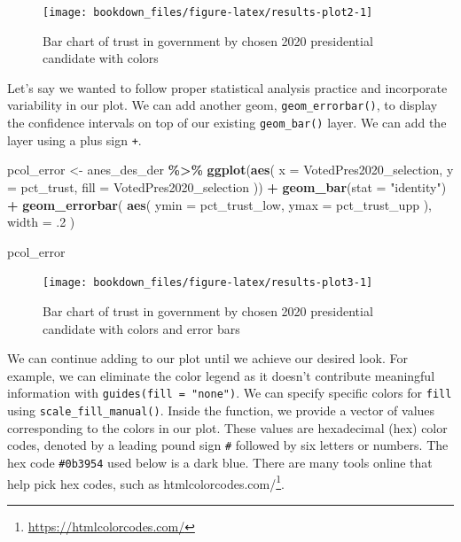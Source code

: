 \documentclass[
]{krantz}
\makeatletter
\newenvironment{Shaded}{\begin{snugshade}}{\end{snugshade}}
\newcommand{\AttributeTok}[1]{\textcolor[rgb]{0.27,0.27,0.27}{#1}}
\newcommand{\DecValTok}[1]{\textcolor[rgb]{0.06,0.06,0.06}{#1}}
\newcommand{\FunctionTok}[1]{\textcolor[rgb]{0.27,0.27,0.27}{\textbf{#1}}}
\newcommand{\NormalTok}[1]{#1}
\newcommand{\OtherTok}[1]{\textcolor[rgb]{0.37,0.37,0.37}{#1}}
\newcommand{\SpecialCharTok}[1]{\textcolor[rgb]{0.43,0.43,0.43}{\textbf{#1}}}
\newcommand{\StringTok}[1]{\textcolor[rgb]{0.5,0.5,0.5}{#1}}
\renewcommand{\href}[2]{#2\footnote{\url{#1}}}
\newenvironment{kframe}{%
\medskip{}
\setlength{\fboxsep}{.8em}
 \def\at@end@of@kframe{}%
 \ifinner\ifhmode%
  \def\at@end@of@kframe{\end{minipage}}%
  \begin{minipage}{\columnwidth}%
 \fi\fi%
 \def\FrameCommand##1{\hskip\@totalleftmargin \hskip-\fboxsep
 \colorbox{shadecolor}{##1}\hskip-\fboxsep
     \hskip-\linewidth \hskip-\@totalleftmargin \hskip\columnwidth}%
 \MakeFramed {\advance\hsize-\width
   \@totalleftmargin\z@ \linewidth\hsize
   \@setminipage}}%
 {\par\unskip\endMakeFramed%
 \at@end@of@kframe}
\renewenvironment{Shaded}{\begin{kframe}}{\end{kframe}}
\makeatother
\begin{document}
\begin{figure}
\texttt{[image: bookdown\_files/figure-latex/results-plot2-1]} \caption{Bar chart of trust in government by chosen 2020 presidential candidate with colors}\label{fig:results-plot2}
\end{figure}

Let's say we wanted to follow proper statistical analysis practice and incorporate variability in our plot. We can add another geom, \texttt{geom\_errorbar()}, to display the confidence intervals on top of our existing \texttt{geom\_bar()} layer. We can add the layer using a plus sign \texttt{+}.

\begin{Shaded}
\begin{Highlighting}[]
\NormalTok{pcol\_error }\OtherTok{\textless{}{-}}\NormalTok{ anes\_des\_der }\SpecialCharTok{\%\textgreater{}\%}
  \FunctionTok{ggplot}\NormalTok{(}\FunctionTok{aes}\NormalTok{(}
    \AttributeTok{x =}\NormalTok{ VotedPres2020\_selection,}
    \AttributeTok{y =}\NormalTok{ pct\_trust,}
    \AttributeTok{fill =}\NormalTok{ VotedPres2020\_selection}
\NormalTok{  )) }\SpecialCharTok{+}
  \FunctionTok{geom\_bar}\NormalTok{(}\AttributeTok{stat =} \StringTok{"identity"}\NormalTok{) }\SpecialCharTok{+}
  \FunctionTok{geom\_errorbar}\NormalTok{(}
    \FunctionTok{aes}\NormalTok{(}
      \AttributeTok{ymin =}\NormalTok{ pct\_trust\_low,}
      \AttributeTok{ymax =}\NormalTok{ pct\_trust\_upp}
\NormalTok{    ),}
    \AttributeTok{width =}\NormalTok{ .}\DecValTok{2}
\NormalTok{  )}

\NormalTok{pcol\_error}
\end{Highlighting}
\end{Shaded}

\begin{figure}
\texttt{[image: bookdown\_files/figure-latex/results-plot3-1]} \caption{Bar chart of trust in government by chosen 2020 presidential candidate with colors and error bars}\label{fig:results-plot3}
\end{figure}

We can continue adding to our plot until we achieve our desired look. For example, we can eliminate the color legend as it doesn't contribute meaningful information with \texttt{guides(fill\ =\ "none")}. We can specify specific colors for \texttt{fill} using \texttt{scale\_fill\_manual()}. Inside the function, we provide a vector of values corresponding to the colors in our plot. These values are hexadecimal (hex) color codes, denoted by a leading pound sign \texttt{\#} followed by six letters or numbers. The hex code \texttt{\#0b3954} used below is a dark blue. There are many tools online that help pick hex codes, such as \href{https://htmlcolorcodes.com/}{htmlcolorcodes.com/}.
\end{document}
